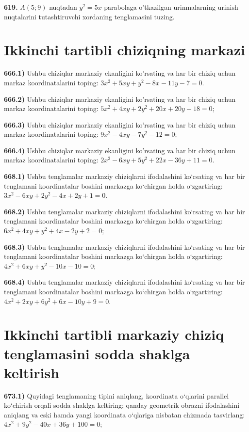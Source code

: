 \textbf{619.} $A(5;9)$ nuqtadan $y^2=5x$ parabolaga o'tkazilgan urinmalarning urinish nuqtalarini tutashtiruvchi xordaning tenglamasini tuzing.



\section{ Ikkinchi tartibli chiziqning markazi }



\textbf{666.1)} Ushbu chiziqlar markaziy ekanligini ko'rsating va har bir chiziq uchun markaz koordinatalarini toping: $3x^2+5xy+y^2-8x-11y-7=0$.

\textbf{666.2)} Ushbu chiziqlar markaziy ekanligini ko'rsating va har bir chiziq uchun markaz koordinatalarini toping: $5 x^2+4 x y+2 y^2+20 x+20 y-18=0$;

\textbf{666.3)} Ushbu chiziqlar markaziy ekanligini ko'rsating va har bir chiziq uchun markaz koordinatalarini toping: $9 x^2-4 x y-7 y^2-12=0$;

\textbf{666.4)} Ushbu chiziqlar markaziy ekanligini ko'rsating va har bir chiziq uchun markaz koordinatalarini toping: $2 x^2-6 x y+5 y^2+22 x-36 y+11=0$.

\textbf{668.1)} Ushbu tenglamalar markaziy chiziqlarni ifodalashini ko‘rsating va har bir tenglamani koordinatalar boshini markazga ko‘chirgan holda o‘zgartiring: $3x^2-6xy+2y^2-4x+2y+1=0$.

\textbf{668.2)} Ushbu tenglamalar markaziy chiziqlarni ifodalashini ko‘rsating va har bir tenglamani koordinatalar boshini markazga ko‘chirgan holda o‘zgartiring: $6 x^2+4 x y+y^2+4 x-2 y+2=0$;

\textbf{668.3)} Ushbu tenglamalar markaziy chiziqlarni ifodalashini ko‘rsating va har bir tenglamani koordinatalar boshini markazga ko‘chirgan holda o‘zgartiring: $4 x^2+6 x y+y^2-10 x-10=0$;

\textbf{668.4)} Ushbu tenglamalar markaziy chiziqlarni ifodalashini ko‘rsating va har bir tenglamani koordinatalar boshini markazga ko‘chirgan holda o‘zgartiring: $4 x^2+2 x y+6 y^2+6 x-10 y+9=0$.



\section{Ikkinchi tartibli markaziy chiziq tenglamasini sodda shaklga keltirish}



\textbf{673.1)} Quyidagi tenglamaning tipini aniqlang, koordinata o‘qlarini parallel ko‘chirish orqali sodda shaklga keltiring; qanday geometrik obrazni ifodalashini aniqlang va eski hamda yangi koordinata o‘qlariga nisbatan chizmada tasvirlang: $4 x^2+9 y^2-40 x+36 y+100=0$;

